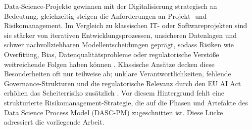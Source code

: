 Data-Science-Projekte gewinnen mit der Digitalisierung strategisch an Bedeutung, gleichzeitig steigen die Anforderungen an Projekt- und Risikomanagement.
Im Vergleich zu klassischen IT- oder Softwareprojekten sind sie stärker von iterativen Entwicklungsprozessen, unsicheren Datenlagen und schwer nachvollziehbaren Modellentscheidungen geprägt, sodass Risiken wie Overfitting, Bias, Datenqualitätsprobleme oder regulatorische Verstöße weitreichende Folgen haben können \citep{holtkemper_risk_2023}.
Klassische Ansätze decken diese Besonderheiten oft nur teilweise ab; unklare Verantwortlichkeiten, fehlende Governance-Strukturen und die regulatorische Relevanz durch den EU AI Act erhöhen das Scheiterrisiko zusätzlich \citep{EUAIAct2024}.
Vor diesem Hintergrund fehlt eine strukturierte Risikomanagement-Strategie, die auf die Phasen und Artefakte des Data Science Process Model (DASC-PM) zugeschnitten ist.
Diese Lücke adressiert die vorliegende Arbeit.

